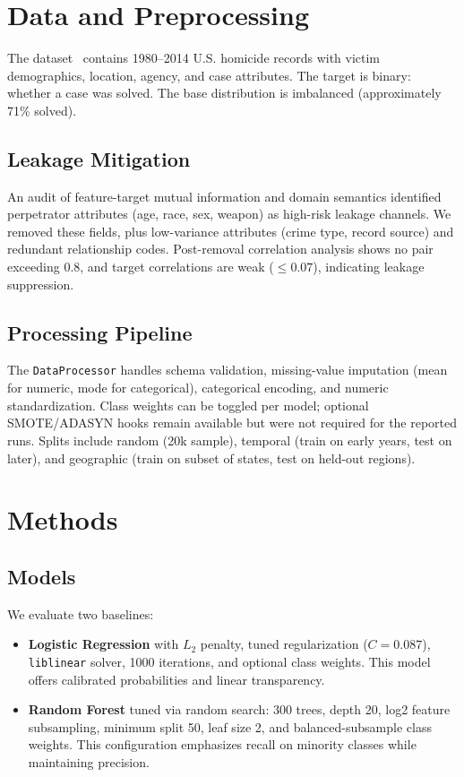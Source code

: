\documentclass[sigconf]{acmart}
\begin{document}
\section{Data and Preprocessing}
The dataset~\cite{larion2017homicide,murderaccountability} contains 1980--2014 U.S. homicide records with victim demographics, location, agency, and case attributes. The target is binary: whether a case was solved. The base distribution is imbalanced (approximately 71\% solved).

\subsection{Leakage Mitigation}
An audit of feature-target mutual information and domain semantics identified perpetrator attributes (age, race, sex, weapon) as high-risk leakage channels. We removed these fields, plus low-variance attributes (crime type, record source) and redundant relationship codes. Post-removal correlation analysis shows no pair exceeding 0.8, and target correlations are weak ($\leq 0.07$), indicating leakage suppression.

\subsection{Processing Pipeline}
The \texttt{DataProcessor} handles schema validation, missing-value imputation (mean for numeric, mode for categorical), categorical encoding, and numeric standardization. Class weights can be toggled per model; optional SMOTE/ADASYN hooks remain available but were not required for the reported runs. Splits include random (20k sample), temporal (train on early years, test on later), and geographic (train on subset of states, test on held-out regions).

\section{Methods}
\subsection{Models}
We evaluate two baselines:
\begin{itemize}
    \item \textbf{Logistic Regression} with $L_{2}$ penalty, tuned regularization ($C{=}0.087$), \texttt{liblinear} solver, 1000 iterations, and optional class weights. This model offers calibrated probabilities and linear transparency.
    \item \textbf{Random Forest} tuned via random search: 300 trees, depth 20, log2 feature subsampling, minimum split 50, leaf size 2, and balanced-subsample class weights. This configuration emphasizes recall on minority classes while maintaining precision.
\end{itemize}
\end{document}
